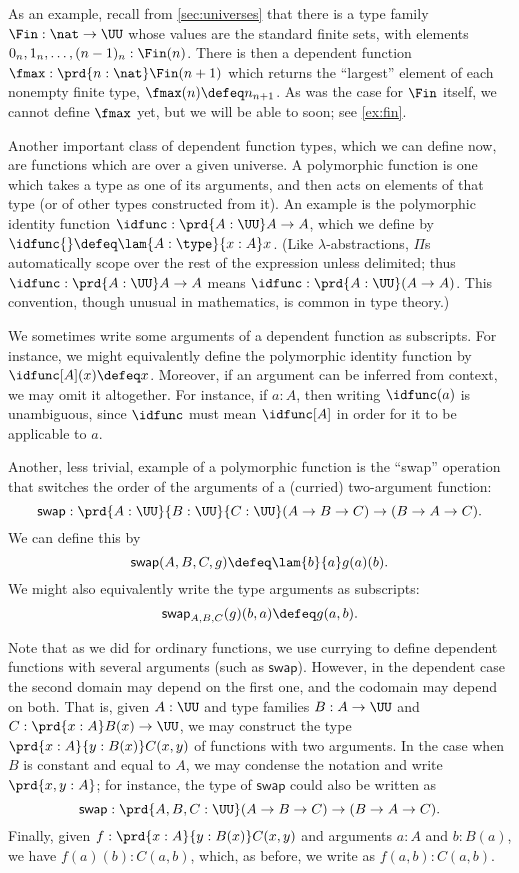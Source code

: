 As an example, recall from \cref{sec:universes} that there is a type family $\Fin:\nat\to\UU$ whose values are the standard finite sets, with elements $0_n,1_n,\dots,(n-1)_n : \Fin(n)$.
There is then a dependent function $\fmax : \prd{n:\nat} \Fin(n+1)$
which returns the ``largest'' element of each nonempty finite type, $\fmax(n) \defeq n_{n+1}$.
%
As was the case for $\Fin$ itself, we cannot define $\fmax$ yet, but we will be able to soon; see \cref{ex:fin}.

Another important class of dependent function types, which we can define now, are functions which are 
%
%
over a given universe.
A polymorphic function is one which takes a type as one of its arguments, and then acts on elements of that type (or of other types constructed from it).
%
%
%
An example is the polymorphic identity function $\idfunc : \prd{A:\UU} A \to A$, which we define by $\idfunc{} \defeq \lam{A:\type}{x:A} x$.
(Like $\lambda$-abstractions, $\Pi$s automatically scope over the rest of the expression unless delimited; thus $\idfunc : \prd{A:\UU} A \to A$ means $\idfunc : \prd{A:\UU} (A \to A)$.
This convention, though unusual in mathematics, is common in type theory.)

We sometimes write some arguments of a dependent function as subscripts.
For instance, we might equivalently define the polymorphic identity function by $\idfunc[A](x) \defeq x$.
Moreover, if an argument can be inferred from context, we may omit it altogether.
For instance, if $a:A$, then writing $\idfunc(a)$ is unambiguous, since $\idfunc$ must mean $\idfunc[A]$ in order for it to be applicable to $a$.

Another, less trivial, example of a polymorphic function is the ``swap'' operation that switches the order of the arguments of a (curried) two-argument function:
\[ \mathsf{swap} : \prd{A:\UU}{B:\UU}{C:\UU} (A\to B\to C) \to (B\to A \to C). \]
We can define this by
\[ \mathsf{swap}(A,B,C,g) \defeq \lam{b}{a} g(a)(b). \]
We might also equivalently write the type arguments as subscripts:
\[ \mathsf{swap}_{A,B,C}(g)(b,a) \defeq g(a,b). \]

Note that as we did for ordinary functions, we use currying to define dependent functions with
several arguments (such as $\mathsf{swap}$). However, in the dependent case the second domain may
depend on the first one, and the codomain may depend on both. That is,
given $A:\UU$ and type families $B : A \to \UU$ and $C : \prd{x:A}B(x) \to \UU$, we may construct
the type $\prd{x:A}{y : B(x)} C(x,y)$ of functions with two
arguments.
In the case when $B$ is constant and equal to $A$, we may condense the notation and write $\prd{x,y:A}$; for instance, the type of $\mathsf{swap}$ could also be written as
\[ \mathsf{swap} : \prd{A,B,C:\UU} (A\to B\to C) \to (B\to A \to C). \]
Finally, given $f:\prd{x:A}{y : B(x)} C(x,y)$ and arguments $a:A$ and $b:B(a)$, we have $f(a)(b) : C(a,b)$, which,
as before, we write as $f(a,b) : C(a,b)$.

